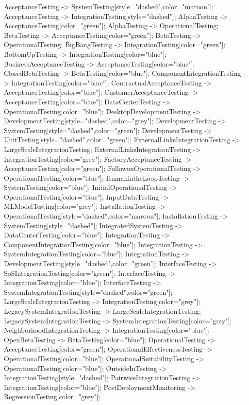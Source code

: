 \documentclass{article}
\begin{document}
{AcceptanceTesting -> SystemTesting[style="dashed",color="maroon"];
AcceptanceTesting -> IntegrationTesting[style="dashed"];
AlphaTesting -> AcceptanceTesting[color="green"];
AlphaTesting -> OperationalTesting;
BetaTesting -> AcceptanceTesting[color="green"];
BetaTesting -> OperationalTesting;
BigBangTesting -> IntegrationTesting[color="green"];
BottomUpTesting -> IntegrationTesting[color="blue"];
BusinessAcceptanceTesting -> AcceptanceTesting[color="blue"];
ClosedBetaTesting -> BetaTesting[color="blue"];
ComponentIntegrationTesting -> IntegrationTesting[color="blue"];
ContractualAcceptanceTesting -> AcceptanceTesting[color="blue"];
CustomerAcceptanceTesting -> AcceptanceTesting[color="blue"];
DataCenterTesting -> OperationalTesting[color="blue"];
DesktopDevelopmentTesting -> DevelopmentTesting[style="dashed",color="grey"];
DevelopmentTesting -> SystemTesting[style="dashed",color="green"];
DevelopmentTesting -> UnitTesting[style="dashed",color="green"];
ExternalLinksIntegrationTesting -> LargeScaleIntegrationTesting;
ExternalLinksIntegrationTesting -> IntegrationTesting[color="grey"];
FactoryAcceptanceTesting -> AcceptanceTesting[color="green"];
FollowonOperationalTesting -> OperationalTesting[color="blue"];
HumanintheLoopTesting -> SystemTesting[color="blue"];
InitialOperationalTesting -> OperationalTesting[color="blue"];
InputDataTesting -> MLModelTesting[color="grey"];
InstallationTesting -> OperationalTesting[style="dashed",color="maroon"];
InstallationTesting -> SystemTesting[style="dashed"];
IntegratedSystemTesting -> DataCenterTesting[color="blue"];
IntegrationTesting -> ComponentIntegrationTesting[color="blue"];
IntegrationTesting -> SystemIntegrationTesting[color="blue"];
IntegrationTesting -> DevelopmentTesting[style="dashed",color="green"];
InterfaceTesting -> SoSIntegrationTesting[color="green"];
InterfaceTesting -> IntegrationTesting[color="blue"];
InterfaceTesting -> SystemIntegrationTesting[style="dashed",color="green"];
LargeScaleIntegrationTesting -> IntegrationTesting[color="grey"];
LegacySystemIntegrationTesting -> LargeScaleIntegrationTesting;
LegacySystemIntegrationTesting -> SystemIntegrationTesting[color="grey"];
NeighborhoodIntegrationTesting -> IntegrationTesting[color="blue"];
OpenBetaTesting -> BetaTesting[color="blue"];
OperationalTesting -> AcceptanceTesting[color="green"];
OperationalEffectivenessTesting -> OperationalTesting[color="blue"];
OperationalSuitabilityTesting -> OperationalTesting[color="blue"];
OutsideInTesting -> IntegrationTesting[style="dashed"];
PairwiseIntegrationTesting -> IntegrationTesting[color="blue"];
PostDeploymentMonitoring -> RegressionTesting[color="grey"];
}
\end{document}
